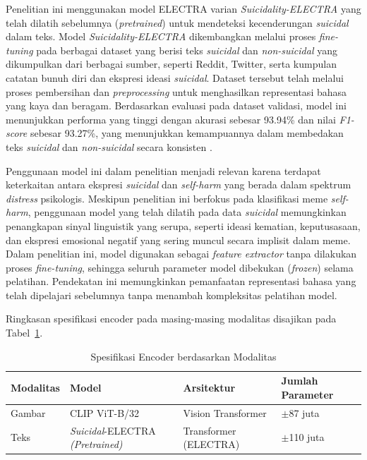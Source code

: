 Penelitian ini menggunakan model ELECTRA varian \textit{Suicidality-ELECTRA} yang telah dilatih sebelumnya (\textit{pretrained}) untuk mendeteksi kecenderungan \textit{suicidal} dalam teks. Model \textit{Suicidality-ELECTRA} dikembangkan melalui proses \textit{fine-tuning} pada berbagai dataset yang berisi teks \textit{suicidal} dan \textit{non-suicidal} yang dikumpulkan dari berbagai sumber, seperti Reddit, Twitter, serta kumpulan catatan bunuh diri dan ekspresi ideasi \textit{suicidal}. Dataset tersebut telah melalui proses pembersihan dan \textit{preprocessing} untuk menghasilkan representasi bahasa yang kaya dan beragam.  Berdasarkan evaluasi pada dataset validasi, model ini menunjukkan performa yang tinggi dengan akurasi sebesar 93.94\% dan nilai \textit{F1-score} sebesar 93.27\%, yang menunjukkan kemampuannya dalam membedakan teks \textit{suicidal} dan \textit{non-suicidal} secara konsisten \cite{Dus2022SuicidalElectra}.

Penggunaan model ini dalam penelitian menjadi relevan karena terdapat keterkaitan antara ekspresi \textit{suicidal} dan \textit{self-harm} yang berada dalam spektrum \textit{distress} psikologis. Meskipun penelitian ini berfokus pada klasifikasi meme \textit{self-harm}, penggunaan model yang telah dilatih pada data \textit{suicidal} memungkinkan penangkapan sinyal linguistik yang serupa, seperti ideasi kematian, keputusasaan, dan ekspresi emosional negatif yang sering muncul secara implisit dalam meme. Dalam penelitian ini, model digunakan sebagai \textit{feature extractor} tanpa dilakukan proses \textit{fine-tuning}, sehingga seluruh parameter model dibekukan (\textit{frozen}) selama pelatihan. Pendekatan ini memungkinkan pemanfaatan representasi bahasa yang telah dipelajari sebelumnya tanpa menambah kompleksitas pelatihan model.

\noindent
Ringkasan spesifikasi encoder pada masing-masing modalitas disajikan pada Tabel~\ref{tabel:spesifikasi_encoder_modalitas}.

\begin{table}[H]
    \centering
    \caption{Spesifikasi Encoder berdasarkan Modalitas}
    \label{tabel:spesifikasi_encoder_modalitas}
    \small
    \setlength{\tabcolsep}{3pt}
    \renewcommand{\arraystretch}{1.1}
    \begin{tabular}{p{1.7cm} p{3.2cm} p{3.0cm} p{2.41cm}}
        \hline
        \textbf{Modalitas} & \textbf{Model} & \textbf{Arsitektur} & \textbf{Jumlah Parameter} \\
        \hline
        Gambar & CLIP ViT-B/32 & Vision Transformer & $\pm$87 juta \\
        Teks & \textit{Suicidal}-ELECTRA \textit{(Pretrained)} & Transformer (ELECTRA) & $\pm$110 juta \\
        \hline
    \end{tabular}
\end{table}


